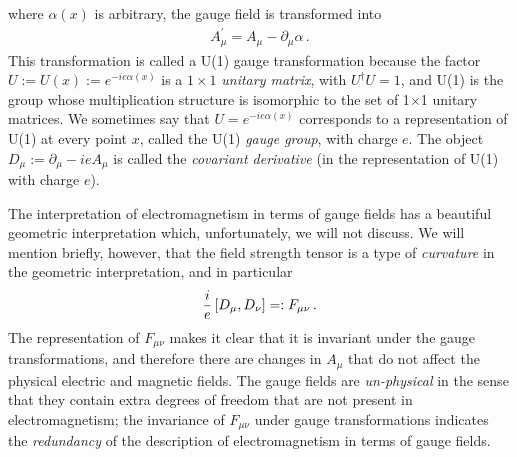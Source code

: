 where \(\alpha(x)\) is arbitrary, the gauge field is transformed into
\begin{align}
    A^\prime_{\mu}
    =
    A_\mu
    -
    \partial_\mu \alpha
    \,.
\end{align}
%
This transformation is called a U(1) gauge transformation because the factor \(U := U(x) := e^{-i e \alpha(x)}\) is a \(1 \times 1\) \textit{unitary matrix}, with \(U^\dagger U = 1\), and U(1) is the group whose multiplication structure is isomorphic to the set of 1\(\times\)1 unitary matrices.
%
We sometimes say that \(U = e^{-i e \alpha(x)}\) corresponds to a representation of U(1) at every point \(x\), called the U(1) \textit{gauge group}, with charge \(e\).
%
The object \(D_\mu := \partial_\mu - i e A_\mu\) is called the \textit{covariant derivative} (in the representation of U(1) with charge \(e\)).


The interpretation of electromagnetism in terms of gauge fields has a beautiful geometric interpretation which, unfortunately, we will not discuss.
%
We will mention briefly, however, that the field strength tensor is a type of \textit{curvature} in the geometric interpretation, and in particular
\begin{align}
    \frac{i}{e} \, \comm{D_\mu}{D_\nu} =: F_{\mu\nu}
    \,.
\end{align}
%
The representation of \(F_{\mu\nu}\) makes it clear that it is invariant under the gauge transformations, and therefore there are changes in \(A_\mu\) that do not affect the physical electric and magnetic fields.
%
The gauge fields are \textit{un-physical} in the sense that they contain extra degrees of freedom that are not present in electromagnetism;
%
the invariance of \(F_{\mu\nu}\) under gauge transformations indicates the \textit{redundancy} of the description of electromagnetism in terms of gauge fields.

